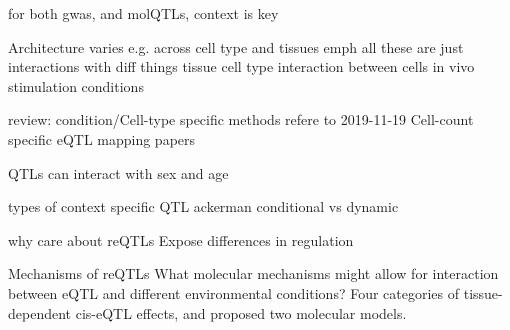\begin{outline}
    \2 for both gwas, and molQTLs, context is key

\1 Architecture varies e.g. across cell type and tissues
\1 emph all these are just interactions with diff things
    \2 tissue
    \2 cell type
    \2 interaction between cells in vivo
    \2 stimulation conditions

review: condition/Cell-type specific methods
    refere to 2019-11-19 Cell-count specific eQTL mapping papers

\1 QTLs can interact with sex and age

\1 types of context specific QTL
    \2 ackerman conditional vs dynamic

\1 why care about reQTLs
Expose differences in regulation



\1 Mechanisms of reQTLs
What molecular mechanisms might allow for interaction between \Gls{eQTL} and different environmental conditions?
Four categories of tissue-dependent cis-eQTL effects, and proposed two molecular models.



\end{outline}
